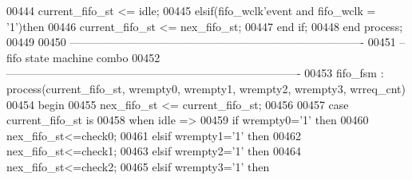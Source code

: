 \begin{DoxyCode}
00444         \textcolor{vhdlchar}{current_fifo_st} \textcolor{vhdlchar}{<=} \textcolor{vhdlchar}{idle};
00445     \textcolor{keywordflow}{elsif}\textcolor{vhdlchar}{(}\textcolor{vhdlchar}{fifo_wclk}\textcolor{vhdlchar}{'}\textcolor{vhdlkeyword}{event} \textcolor{keywordflow}{and} \textcolor{vhdlchar}{fifo_wclk} \textcolor{vhdlchar}{=} \textcolor{vhdlchar}{'}\textcolor{vhdllogic}{}\textcolor{vhdllogic}{1}\textcolor{vhdlchar}{'}\textcolor{vhdlchar}{)}\textcolor{keywordflow}{then} 
00446         \textcolor{vhdlchar}{current_fifo_st} \textcolor{vhdlchar}{<=} \textcolor{vhdlchar}{nex_fifo_st};
00447     \textcolor{keywordflow}{end} \textcolor{keywordflow}{if}; 
00448 \textcolor{keywordflow}{end} \textcolor{keywordflow}{process};
00449 
00450 \textcolor{keyword}{-------------------------------------------------------------------------------}
00451 \textcolor{keyword}{--fifo state machine combo}
00452 \textcolor{keyword}{-------------------------------------------------------------------------------}
00453 fifo\_fsm : \textcolor{keywordflow}{process}(current_fifo_st, wrempty0, wrempty1, wrempty2, wrempty3, 
      wrreq_cnt) 
00454 \textcolor{vhdlkeyword}{begin}
00455     \textcolor{vhdlchar}{nex_fifo_st} \textcolor{vhdlchar}{<=} \textcolor{vhdlchar}{current_fifo_st};
00456     
00457     \textcolor{keywordflow}{case} \textcolor{vhdlchar}{current_fifo_st} \textcolor{keywordflow}{is}
00458       \textcolor{keywordflow}{when} \textcolor{vhdlchar}{idle} \textcolor{vhdlchar}{=}\textcolor{vhdlchar}{>}
00459             \textcolor{keywordflow}{if} \textcolor{vhdlchar}{wrempty0}\textcolor{vhdlchar}{=}\textcolor{vhdlchar}{'}\textcolor{vhdllogic}{}\textcolor{vhdllogic}{1}\textcolor{vhdlchar}{'} \textcolor{keywordflow}{then} 
00460               \textcolor{vhdlchar}{nex_fifo_st}\textcolor{vhdlchar}{<=}\textcolor{vhdlchar}{check0};
00461             \textcolor{keywordflow}{elsif} \textcolor{vhdlchar}{wrempty1}\textcolor{vhdlchar}{=}\textcolor{vhdlchar}{'}\textcolor{vhdllogic}{}\textcolor{vhdllogic}{1}\textcolor{vhdlchar}{'} \textcolor{keywordflow}{then} 
00462               \textcolor{vhdlchar}{nex_fifo_st}\textcolor{vhdlchar}{<=}\textcolor{vhdlchar}{check1};
00463             \textcolor{keywordflow}{elsif} \textcolor{vhdlchar}{wrempty2}\textcolor{vhdlchar}{=}\textcolor{vhdlchar}{'}\textcolor{vhdllogic}{}\textcolor{vhdllogic}{1}\textcolor{vhdlchar}{'} \textcolor{keywordflow}{then}
00464                \textcolor{vhdlchar}{nex_fifo_st}\textcolor{vhdlchar}{<=}\textcolor{vhdlchar}{check2};
00465             \textcolor{keywordflow}{elsif} \textcolor{vhdlchar}{wrempty3}\textcolor{vhdlchar}{=}\textcolor{vhdlchar}{'}\textcolor{vhdllogic}{}\textcolor{vhdllogic}{1}\textcolor{vhdlchar}{'} \textcolor{keywordflow}{then}

\end{DoxyCode}
